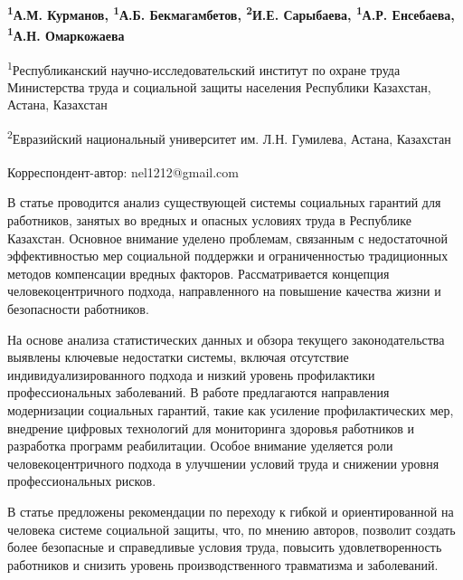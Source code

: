 

\begin{articleheader}


{\bfseries \textsuperscript{1}А.М. Курманов, \textsuperscript{1}А.Б.
Бекмагамбетов, \textsuperscript{2}И.Е. Сарыбаева,
\textsuperscript{1}А.Р. Енсебаева\textsuperscript{\envelope },}
{\bfseries \textsuperscript{1}А.Н. Омаркожаева}
\end{articleheader}
\begin{affiliation}

\textsuperscript{1}Республиканский научно-исследовательский институт по
охране труда Министерства труда и социальной защиты населения Республики Казахстан, Астана,
Казахстан

\textsuperscript{2}Евразийский национальный университет им. Л.Н. Гумилева, Астана, Казахстан

\raggedright{\bfseries \textsuperscript{\envelope }}Корреспондент-автор: nel1212@gmail.com
\end{affiliation}

В статье проводится анализ существующей системы социальных гарантий для
работников, занятых во вредных и опасных условиях труда в Республике
Казахстан. Основное внимание уделено проблемам, связанным с
недостаточной эффективностью мер социальной поддержки и ограниченностью
традиционных методов компенсации вредных факторов. Рассматривается
концепция человекоцентричного подхода, направленного на повышение
качества жизни и безопасности работников.

На основе анализа статистических данных и обзора текущего
законодательства выявлены ключевые недостатки системы, включая
отсутствие индивидуализированного подхода и низкий уровень профилактики
профессиональных заболеваний. В работе предлагаются направления
модернизации социальных гарантий, такие как усиление профилактических
мер, внедрение цифровых технологий для мониторинга здоровья работников и
разработка программ реабилитации. Особое внимание уделяется роли
человекоцентричного подхода в улучшении условий труда и снижении уровня
профессиональных рисков.

В статье предложены рекомендации по переходу к гибкой и ориентированной
на человека системе социальной защиты, что, по мнению авторов, позволит
создать более безопасные и справедливые условия труда, повысить
удовлетворенность работников и снизить уровень производственного
травматизма и заболеваний.

